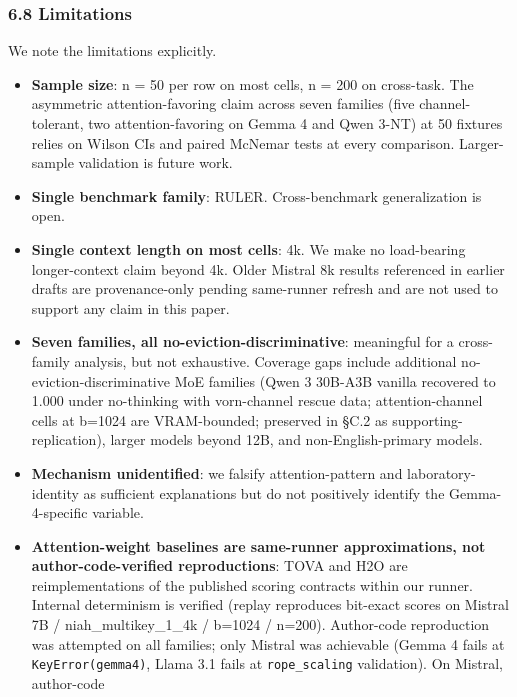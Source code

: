 \documentclass[
]{article}
\providecommand{\tightlist}{%
  \setlength{\itemsep}{0pt}\setlength{\parskip}{0pt}}
\begin{document}
\subsubsection{6.8 Limitations}\label{68-limitations}

We note the limitations explicitly.

\begin{itemize}
\tightlist
\item
  \textbf{Sample size}: n = 50 per row on most cells, n = 200 on
  cross-task. The asymmetric attention-favoring claim across seven
  families (five channel-tolerant, two attention-favoring on Gemma 4
  and Qwen 3-NT) at 50 fixtures relies on Wilson CIs and paired
  McNemar tests at every comparison. Larger-sample validation is
  future work.
\item
  \textbf{Single benchmark family}: RULER. Cross-benchmark
  generalization is open.
\item
  \textbf{Single context length on most cells}: 4k. We make no
  load-bearing longer-context claim beyond 4k. Older Mistral 8k results
  referenced in earlier drafts are provenance-only pending same-runner
  refresh and are not used to support any claim in this paper.
\item
  \textbf{Seven families, all no-eviction-discriminative}: meaningful
  for a cross-family analysis, but not exhaustive. Coverage gaps
  include additional no-eviction-discriminative MoE families (Qwen 3
  30B-A3B vanilla recovered to 1.000 under no-thinking with
  vorn-channel rescue data; attention-channel cells at b=1024 are
  VRAM-bounded; preserved in §C.2 as supporting-replication), larger
  models beyond 12B, and non-English-primary models.
\item
  \textbf{Mechanism unidentified}: we falsify attention-pattern and
  laboratory-identity as sufficient explanations but do not positively
  identify the Gemma-4-specific variable.
\item
  \textbf{Attention-weight baselines are same-runner approximations, not
  author-code-verified reproductions}: TOVA \citep{oren2024tova} and H2O
  \citep{zhang2023h2o} are reimplementations of the published scoring
  contracts within our runner. Internal determinism is verified (replay
  reproduces bit-exact scores on Mistral 7B / niah\_multikey\_1\_4k /
  b=1024 / n=200). Author-code reproduction was attempted on all
  families; only Mistral was achievable (Gemma 4 fails at
  \texttt{KeyError(\textquotesingle{}gemma4\textquotesingle{})}, Llama
  3.1 fails at \texttt{rope\_scaling} validation). On Mistral, author-code

\end{itemize}
\end{document}

